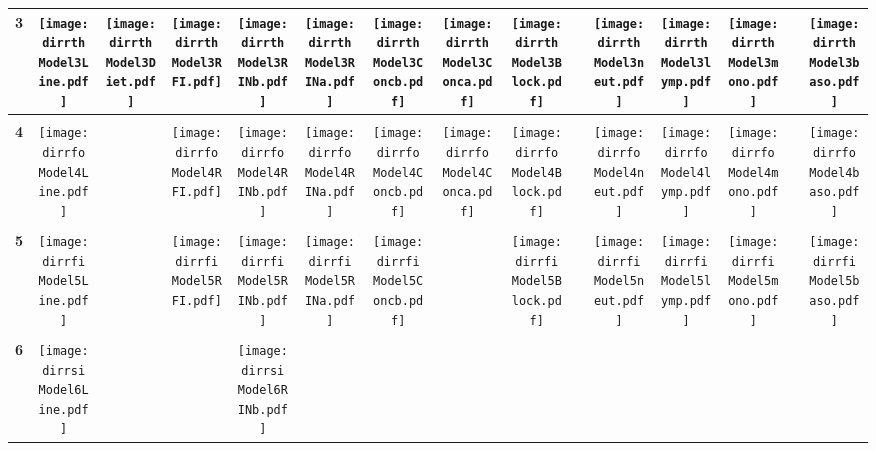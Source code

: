 \documentclass[landscape]{article}
\def \dirrth {U:/R/RA/Data/RFI-newdata/resultsingle/Model3.Line.Diet.RFI.Concb.RINb.Conca.RINa.neut.lymp.mono.baso.Block/}
\def \dirrfo {U:/R/RA/Data/RFI-newdata/resultsingle/Model4.Line.RFI.Concb.RINb.Conca.RINa.neut.lymp.mono.baso.Block/}
\def \dirrfi {U:/R/RA/Data/RFI-newdata/resultsingle/Model5.Line.RFI.Concb.RINb.RINa.neut.lymp.mono.baso.Block/}
\def \dirrsi{U:/R/RA/Data/RFI-newdata/resultsingle/Model6.Line.Concb.RINb.RINa.neut.lymp.mono.baso.Block/}
\begin{document}
\begin{table}
\begin{tabular}{ccccccccccccccc}
      {\Huge \textbf{3}} 
      &\texttt{[image: \\dirrth Model3Line.pdf]}
      &\texttt{[image: \\dirrth Model3Diet.pdf]}
      &\texttt{[image: \\dirrth Model3RFI.pdf]}
      &\texttt{[image: \\dirrth Model3RINb.pdf]}
      &\texttt{[image: \\dirrth Model3RINa.pdf]}
      &\texttt{[image: \\dirrth Model3Concb.pdf]}
      &\texttt{[image: \\dirrth Model3Conca.pdf]}
      &\texttt{[image: \\dirrth Model3Block.pdf]}
      &
      &\texttt{[image: \\dirrth Model3neut.pdf]}
      &\texttt{[image: \\dirrth Model3lymp.pdf]}
      &\texttt{[image: \\dirrth Model3mono.pdf]}
      &
      &\texttt{[image: \\dirrth Model3baso.pdf]}
     \\[3.5pt]
     \hline
     \\[3.5pt]
     {\Huge \textbf{4}} 
      &\texttt{[image: \\dirrfo Model4Line.pdf]}
      &
      &\texttt{[image: \\dirrfo Model4RFI.pdf]}
      &\texttt{[image: \\dirrfo Model4RINb.pdf]}
      &\texttt{[image: \\dirrfo Model4RINa.pdf]}
      &\texttt{[image: \\dirrfo Model4Concb.pdf]}
      &\texttt{[image: \\dirrfo Model4Conca.pdf]}
      &\texttt{[image: \\dirrfo Model4Block.pdf]}
      &
      &\texttt{[image: \\dirrfo Model4neut.pdf]}
      &\texttt{[image: \\dirrfo Model4lymp.pdf]}
      &\texttt{[image: \\dirrfo Model4mono.pdf]}
      &
      &\texttt{[image: \\dirrfo Model4baso.pdf]}
     \\[3.5pt]
     \hline
     \\[3.5pt]
     {\Huge \textbf{5}} 
      &\texttt{[image: \\dirrfi Model5Line.pdf]}
      &
      &\texttt{[image: \\dirrfi Model5RFI.pdf]}
      &\texttt{[image: \\dirrfi Model5RINb.pdf]}
      &\texttt{[image: \\dirrfi Model5RINa.pdf]}
      &\texttt{[image: \\dirrfi Model5Concb.pdf]}
      &
      &\texttt{[image: \\dirrfi Model5Block.pdf]}
      &
      &\texttt{[image: \\dirrfi Model5neut.pdf]}
      &\texttt{[image: \\dirrfi Model5lymp.pdf]}
      &\texttt{[image: \\dirrfi Model5mono.pdf]}
      &
      &\texttt{[image: \\dirrfi Model5baso.pdf]}
     \\[3.5pt]
     \hline
     \\[3.5pt]
     {\Huge \textbf{6}} 
      &\texttt{[image: \\dirrsi Model6Line.pdf]}
      &
      &
      &\texttt{[image: \\dirrsi Model6RINb.pdf]}

\end{tabular}
\end{table}
\end{document}
